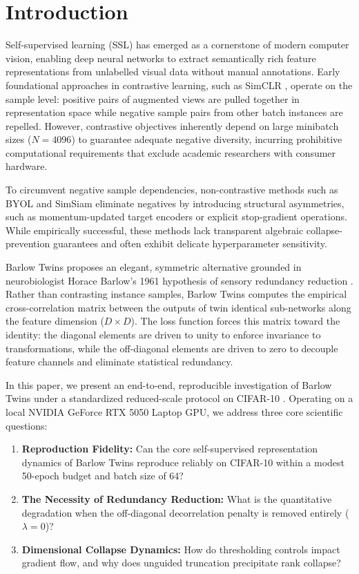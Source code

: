 \documentclass[conference]{IEEEtran}
\begin{document}
\section{Introduction}
Self-supervised learning (SSL) has emerged as a cornerstone of modern computer vision, enabling deep neural networks to extract semantically rich feature representations from unlabelled visual data without manual annotations. Early foundational approaches in contrastive learning, such as SimCLR \cite{chen2020simple}, operate on the sample level: positive pairs of augmented views are pulled together in representation space while negative sample pairs from other batch instances are repelled. However, contrastive objectives inherently depend on large minibatch sizes ($N=4096$) to guarantee adequate negative diversity, incurring prohibitive computational requirements that exclude academic researchers with consumer hardware.

To circumvent negative sample dependencies, non-contrastive methods such as BYOL \cite{grill2020bootstrap} and SimSiam \cite{chen2021exploring} eliminate negatives by introducing structural asymmetries, such as momentum-updated target encoders or explicit stop-gradient operations. While empirically successful, these methods lack transparent algebraic collapse-prevention guarantees and often exhibit delicate hyperparameter sensitivity.

Barlow Twins \cite{zbontar2021barlow} proposes an elegant, symmetric alternative grounded in neurobiologist Horace Barlow's 1961 hypothesis of sensory redundancy reduction \cite{barlow1961possible}. Rather than contrasting instance samples, Barlow Twins computes the empirical cross-correlation matrix between the outputs of twin identical sub-networks along the feature dimension ($D \times D$). The loss function forces this matrix toward the identity: the diagonal elements are driven to unity to enforce invariance to transformations, while the off-diagonal elements are driven to zero to decouple feature channels and eliminate statistical redundancy.

In this paper, we present an end-to-end, reproducible investigation of Barlow Twins under a standardized reduced-scale protocol on CIFAR-10 \cite{krizhevsky2009learning}. Operating on a local NVIDIA GeForce RTX 5050 Laptop GPU, we address three core scientific questions:
\begin{enumerate}
    \item \textbf{Reproduction Fidelity:} Can the core self-supervised representation dynamics of Barlow Twins reproduce reliably on CIFAR-10 within a modest 50-epoch budget and batch size of 64?
    \item \textbf{The Necessity of Redundancy Reduction:} What is the quantitative degradation when the off-diagonal decorrelation penalty is removed entirely ($\lambda=0$)?
    \item \textbf{Dimensional Collapse Dynamics:} How do thresholding controls impact gradient flow, and why does unguided truncation precipitate rank collapse?
\end{enumerate}
\end{document}
